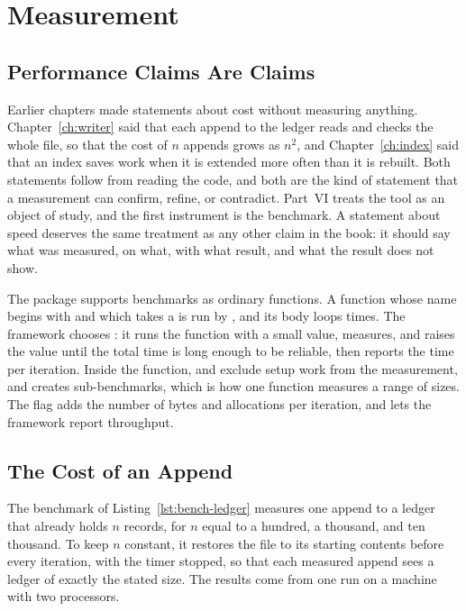 \chapter{Measurement}
\label{ch:measurement}

\section{Performance Claims Are Claims}

Earlier chapters made statements about cost without measuring anything. Chapter~\ref{ch:writer} said that each append to the ledger reads and checks the whole file, so that the cost of $n$ appends grows as $n^2$, and Chapter~\ref{ch:index} said that an index saves work when it is extended more often than it is rebuilt. Both statements follow from reading the code, and both are the kind of statement that a measurement can confirm, refine, or contradict. Part~VI treats the tool as an object of study, and the first instrument is the benchmark. A statement about speed deserves the same treatment as any other claim in the book: it should say what was measured, on what, with what result, and what the result does not show.

The  package supports benchmarks as ordinary functions. A function whose name begins with  and which takes a  is run by , and its body loops  times. The framework chooses : it runs the function with a small value, measures, and raises the value until the total time is long enough to be reliable, then reports the time per iteration. Inside the function,  and  exclude setup work from the measurement, and  creates sub-benchmarks, which is how one function measures a range of sizes. The flag  adds the number of bytes and allocations per iteration, and  lets the framework report throughput.

\section{The Cost of an Append}


The benchmark of Listing~\ref{lst:bench-ledger} measures one append to a ledger that already holds $n$ records, for $n$ equal to a hundred, a thousand, and ten thousand. To keep $n$ constant, it restores the file to its starting contents before every iteration, with the timer stopped, so that each measured append sees a ledger of exactly the stated size. The results come from one run on a machine with two processors.

